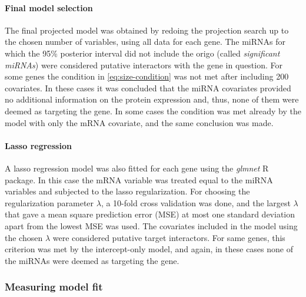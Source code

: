 \paragraph{Final model selection}
The final projected model was obtained by redoing the projection search up to
the chosen number of variables, using all data for each gene. The miRNAs for
which the 95\% posterior interval did not include the origo (called
\emph{significant miRNAs}) were considered putative interactors with the gene
in question. For some genes the condition in \eqref{eq:size-condition} was not
met after including 200 covariates. In these cases it was concluded that the
miRNA covariates provided no additional information on the protein expression
and, thus, none of them were deemed as targeting the gene. In some cases the
condition was met already by the model with only the mRNA covariate, and the
same conclusion was made.

\paragraph{Lasso regression}
A lasso regression model was also fitted for each gene using the
\emph{glmnet} R package. In this case the mRNA variable was treated equal
to the miRNA variables and subjected to the lasso regularization.
For choosing the regularization parameter $\lambda$, a 10-fold cross
validation was done, and the largest $\lambda$ that gave
a mean square prediction error (MSE) at most one standard deviation
apart from the lowest MSE was used. The covariates included
in the model using the chosen $\lambda$ were considered putative
target interactors. For same genes, this criterion was met by
the intercept-only model, and again, in these cases
none of the miRNAs were deemed as targeting the gene.



\subsubsection{Measuring model fit}

